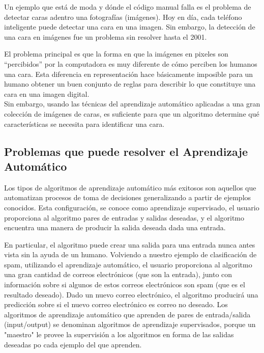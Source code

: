  Un ejemplo que está de moda y dónde el código manual falla es el problema de detectar caras adentro una  fotografías  (imágenes).   Hoy en día, cada teléfono inteligente puede detectar una cara en una imagen. Sin embargo, la detección de una cara en imágenes  fue un problema sin resolver hasta  el 2001. 
   
 El problema principal es que la forma en que la imágenes en pixeles son “percibidos” por la computadora es muy diferente de cómo perciben los humanos una cara. Esta diferencia en representación hace básicamente  imposible para un humano obtener un buen conjunto de reglas para describir lo que constituye una cara en una imagen digital.\\
 
  
 Sin embargo, usando las técnicas del aprendizaje automático aplicadas a una gran colección de imágenes de caras, es suficiente para que un algoritmo determine qué características se necesita para identificar una cara.
 


\subsection{Problemas que puede resolver el Aprendizaje Automático}



Los tipos de algoritmos de aprendizaje automático más exitosos son aquellos que automatizan  procesos de toma de decisiones generalizando a partir de ejemplos conocidos. Esta configuración,  se conoce como aprendizaje supervisado, el usuario proporciona al algoritmo pares de  entradas y salidas deseadas, y el algoritmo encuentra una manera de producir la salida deseada dada una entrada.

En particular, el algoritmo puede crear una salida para una entrada nunca antes vista sin la ayuda de un humano. Volviendo a nuestro ejemplo  de clasificación de spam, utilizando el aprendizaje automático, el usuario proporciona al algoritmo una  gran cantidad de correos electrónicos (que son la entrada), junto con información sobre  si algunos  de estos correos electrónicos son  spam (que es el resultado deseado). Dado un nuevo  correo electrónico, el algoritmo producirá una predicción sobre si el nuevo correo electrónico es  correo no deseado. Los algoritmos de aprendizaje automático que aprenden de pares de entrada/salida (input/output) se denominan algoritmos de aprendizaje supervisados, porque un "maestro"{}   
 le provee la supervisión a los algoritmos en forma de las salidas deseadas po cada ejemplo del que aprenden. 

